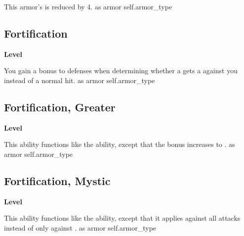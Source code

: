 \vspace{-1.5em}  %
This armor's  is reduced by 4.
 
 as armor
 {self.armor_type}
\begin{multicols}{2}
\lowercase{\hypertarget{item:Fortification}{}}\label{item:Fortification}
\hypertarget{item:Fortification}{\subsection{Fortification}}
\columnbreak%
\begin{flushright}
\large\textbf{ Level}
\end{flushright}
\end{multicols}
\vspace{-1.5em}  %
You gain a  bonus to defenses when determining whether a  gets a  against you instead of a normal hit.
 
 as armor
 {self.armor_type}
\begin{multicols}{2}
\lowercase{\hypertarget{item:Fortification, Greater}{}}\label{item:Fortification, Greater}
\hypertarget{item:Fortification, Greater}{\subsection{Fortification, Greater}}
\columnbreak%
\begin{flushright}
\large\textbf{ Level}
\end{flushright}
\end{multicols}
\vspace{-1.5em}  %
This ability functions like the  ability, except that the bonus increases to .
 
 as armor
 {self.armor_type}
\begin{multicols}{2}
\lowercase{\hypertarget{item:Fortification, Mystic}{}}\label{item:Fortification, Mystic}
\hypertarget{item:Fortification, Mystic}{\subsection{Fortification, Mystic}}
\columnbreak%
\begin{flushright}
\large\textbf{ Level}
\end{flushright}
\end{multicols}
\vspace{-1.5em}  %
This ability functions like the  ability, except that it applies against all attacks instead of only against .
 
 as armor
 {self.armor_type}
